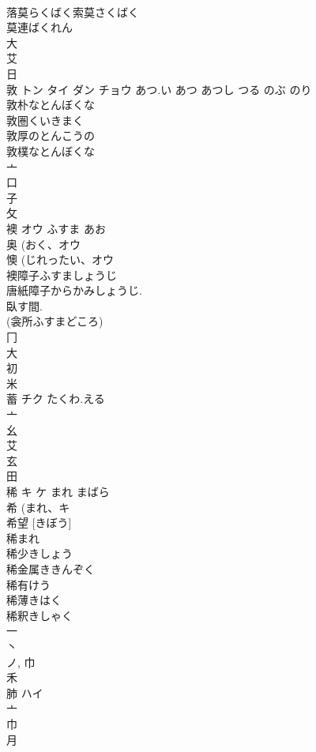 \documentclass[8pt]{extreport}
\begin{document}
\begin{CJK}{UTF8}{min}
\\	落莫らくばく索莫さくばく
\\	莫連ばくれん
\\	大 
\\	艾 
\\	日 
\\	敦	トン タイ ダン チョウ	あつ.い あつ あつし つる のぶ のり	
\\	敦朴なとんぼくな
\\	敦圏くいきまく
\\	敦厚のとんこうの
\\	敦樸なとんぼくな
\\	亠 
\\	口 
\\	子 
\\	攵 
\\	襖	オウ	ふすま あお	
\\	奥 (おく、オウ 
\\	懊 (じれったい、オウ 
\\	襖障子ふすましょうじ 
\\	唐紙障子からかみしょうじ. 
\\	臥す間. 
\\	(衾所ふすまどころ) 
\\	冂 
\\	大 
\\	初 
\\	米 
\\	蓄	チク	たくわ.える	
\\	亠 
\\	幺 
\\	艾 
\\	玄 
\\	田 
\\	稀	キ ケ	まれ まばら	
\\	希 (まれ、キ 
\\	希望 [きぼう] 
\\	稀まれ
\\	稀少きしょう
\\	稀金属ききんぞく
\\	稀有けう
\\	稀薄きはく
\\	稀釈きしゃく
\\	一 
\\	丶 
\\	ノ, 巾 
\\	禾 
\\	肺	ハイ		
\\	亠 
\\	巾 
\\	月 

\end{CJK}
\end{document}
